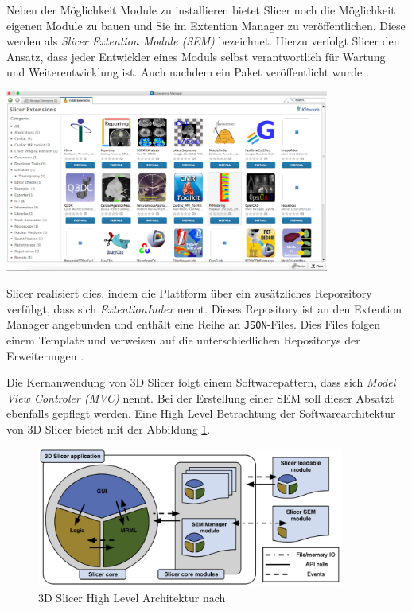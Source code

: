 \begin{minipage}{0.40\textwidth}
	Neben der Möglichkeit Module zu installieren bietet Slicer noch die Möglichkeit
	eigenen Module zu bauen und Sie im Extention Manager zu veröffentlichen. Diese
	werden als \textit{Slicer Extention Module (SEM)} bezeichnet. Hierzu verfolgt
	Slicer den Ansatz, dass jeder Entwickler eines Moduls selbst verantwortlich für
	Wartung und Weiterentwicklung ist. Auch nachdem ein Paket veröffentlicht wurde
	\citep{slicer2024}.
\end{minipage}
\hfill
\begin{minipage}{0.50\textwidth}
	\centering
	\includegraphics[width=0.8\textwidth]{img/extensions_manager.png}
	 \label{fig:3d_slicer_extention_manager}
\end{minipage}

Slicer realisiert dies, indem die Plattform über ein zusätzliches Reporsitory verfühgt,
dass sich \textit{ExtentionIndex} nennt. Dieses Repository ist an den Extention
Manager angebunden und enthält eine Reihe an \texttt{JSON}-Files. Dies Files
folgen einem Template und verweisen auf die unterschiedlichen Repositorys der
Erweiterungen \citep[vgl.][]{slicer2024}.

Die Kernanwendung von 3D Slicer folgt einem Softwarepattern, dass sich \textit{Model
View Controler (MVC)} nennt. Bei der Erstellung einer SEM soll dieser Absatzt
ebenfalls gepflegt werden. Eine High Level Betrachtung der Softwarearchitektur von
3D Slicer bietet \cite[Seite 1332]{fedorov2012slicer} mit der Abbildung \ref{fig:3d_slicer_architektur}.

\begin{figure}[h]
	\centering
	\includegraphics[width=0.9\textwidth]{img/3d_slicer_architektur.jpg}
	\caption{3D Slicer High Level Architektur nach \citet[Seite 1326]{fedorov2012slicer}}
	\label{fig:3d_slicer_architektur}
\end{figure}

